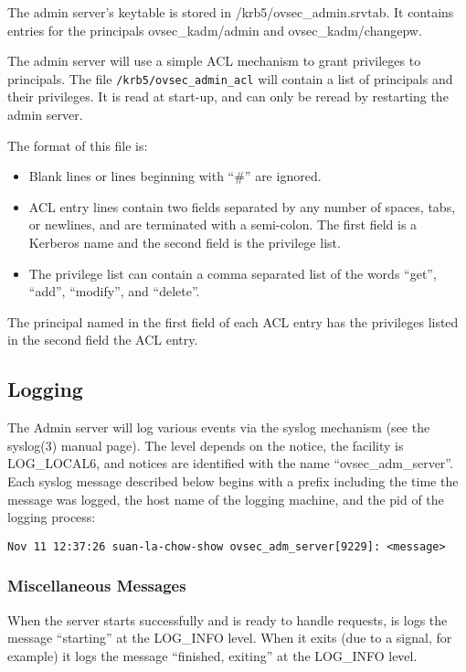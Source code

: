 The admin server's keytable is stored in /krb5/ovsec_admin.srvtab.  It
contains entries for the principals ovsec_kadm/admin and
ovsec_kadm/changepw.

The admin server will use a simple ACL mechanism to grant privileges
to principals.  The file {\tt /krb5/ovsec_admin_acl} will contain a
list of principals and their privileges.  It is read at start-up, and
can only be reread by restarting the admin server.

The format of this file is:

\begin{itemize}
\item Blank lines or lines beginning with ``\#'' are ignored.

\item ACL entry lines contain two fields separated by any number of
spaces, tabs, or newlines, and are terminated with a semi-colon.  The
first field is a Kerberos name and the second field is the privilege
list.

\item The privilege list can contain a comma separated list of the
words ``get'', ``add'', ``modify'', and ``delete''.
\end{itemize}

The principal named in the first field of each ACL entry has the
privileges listed in the second field the ACL entry.

\subsection{Logging}

The Admin server will log various events via the syslog mechanism (see
the syslog(3) manual page).  The level depends on the notice, the
facility is LOG_LOCAL6, and notices are identified with the name
``ovsec_adm_server''.  Each syslog message described below begins with
a prefix including the time the message was logged, the host name of
the logging machine, and the pid of the logging process:

\begin{verbatim}
Nov 11 12:37:26 suan-la-chow-show ovsec_adm_server[9229]: <message>
\end{verbatim}

\subsubsection{Miscellaneous Messages}

When the server starts successfully and is ready to handle requests,
is logs the message ``starting'' at the LOG_INFO level.  When it exits
(due to a signal, for example) it logs the message ``finished,
exiting'' at the LOG_INFO level.

